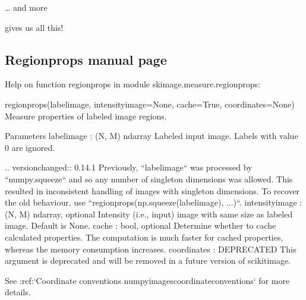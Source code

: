 \documentclass[letterpaper,10pt,english]{sphinxmanual}
\begin{document}
\sphinxAtStartPar
… and more

\sphinxAtStartPar
{} gives us all this!


\subsection{Regionprops manual page}
\label{\detokenize{06-ShapeAnalysis:regionprops-manual-page}}
\begin{sphinxVerbatim}[commandchars=\\\{\}]
   
\end{sphinxVerbatim}

\begin{sphinxVerbatim}[commandchars=\\\{\}]
Help on function regionprops in module skimage.measure.\PYGZus{}regionprops:

regionprops(label\PYGZus{}image, intensity\PYGZus{}image=None, cache=True, coordinates=None)
    Measure properties of labeled image regions.
    
    Parameters
    \PYGZhy{}\PYGZhy{}\PYGZhy{}\PYGZhy{}\PYGZhy{}\PYGZhy{}\PYGZhy{}\PYGZhy{}\PYGZhy{}\PYGZhy{}
    label\PYGZus{}image : (N, M) ndarray
        Labeled input image. Labels with value 0 are ignored.
    
        .. versionchanged:: 0.14.1
            Previously, ``label\PYGZus{}image`` was processed by ``numpy.squeeze`` and
            so any number of singleton dimensions was allowed. This resulted in
            inconsistent handling of images with singleton dimensions. To
            recover the old behaviour, use
            ``regionprops(np.squeeze(label\PYGZus{}image), ...)``.
    intensity\PYGZus{}image : (N, M) ndarray, optional
        Intensity (i.e., input) image with same size as labeled image.
        Default is None.
    cache : bool, optional
        Determine whether to cache calculated properties. The computation is
        much faster for cached properties, whereas the memory consumption
        increases.
    coordinates : DEPRECATED
        This argument is deprecated and will be removed in a future version
        of scikit\PYGZhy{}image.
    
        See :ref:`Coordinate conventions \PYGZlt{}numpy\PYGZhy{}images\PYGZhy{}coordinate\PYGZhy{}conventions\PYGZgt{}`
        for more details.
    

\end{sphinxVerbatim}
\end{document}
